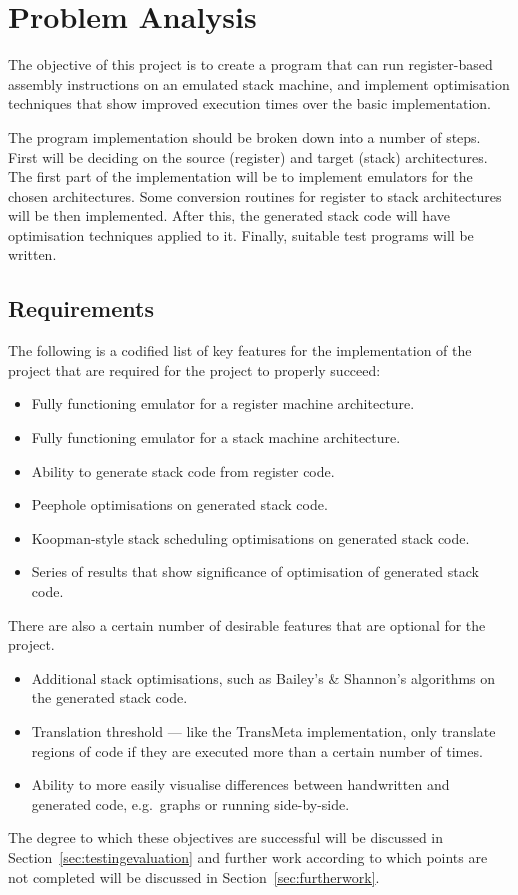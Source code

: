 \chapter{Problem Analysis}\label{ch:problemanalysis}
The objective of this project is to create a program that can run
register-based assembly instructions on an emulated stack machine, and implement
optimisation techniques that show improved execution times over the basic
implementation.

The program implementation should be broken down into a number of steps. First
will be deciding on the source (register) and target (stack) architectures.  The
first part of the implementation will be to implement emulators for the chosen
architectures.  Some conversion routines for register to stack architectures
will be then implemented. After this, the generated stack code will have
optimisation techniques applied to it. Finally, suitable test programs will be
written.

\section{Requirements}
The following is a codified list of key features for the implementation of
the project that are required for the project to properly succeed:

\begin{itemize}[noitemsep]
  \item Fully functioning emulator for a register machine architecture.
  \item Fully functioning emulator for a stack machine architecture.
  \item Ability to generate stack code from register code.
  \item Peephole optimisations on generated stack code.
  \item Koopman-style stack scheduling optimisations on generated stack code.
  \item Series of results that show significance of optimisation of generated
    stack code.
\end{itemize}

There are also a certain number of desirable features that are optional for the
project.

\begin{itemize}[noitemsep]
  \item Additional stack optimisations, such as Bailey's \& Shannon's algorithms
    on the generated stack code.
  \item Translation threshold --- like the TransMeta implementation, only
  translate regions of code if they are executed more than a certain number of
  times.
  \item Ability to more easily visualise differences between handwritten and
  generated code, e.g.\ graphs or running side-by-side.
\end{itemize}

The degree to which these objectives are successful will be discussed in
Section~\ref{sec:testingevaluation} and further work according to which points
are not completed will be discussed in Section~\ref{sec:furtherwork}.
